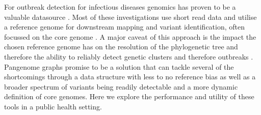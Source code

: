 For outbreak detection for infectious diseases genomics has proven to be a valuable datasource \citep{article}. Most of these investigations use short read data \citep{article} and utilise a reference genome for downstream mapping and variant identification, often focussed on the core genome \citep{article}. A major caveat of this approach is the impact the chosen reference genome has on the resolution of the phylogenetic tree and therefore the ability to reliably detect genetic clusters and therefore outbreaks \citep{article}. Pangenome graphs promise to be a solution that can tackle several of the shortcomings through a data structure with less to no reference bias as well as a broader spectrum of variants being readily detectable and a more dynamic definition of core genomes. Here we explore the performance and utility of these tools in a public health setting.

